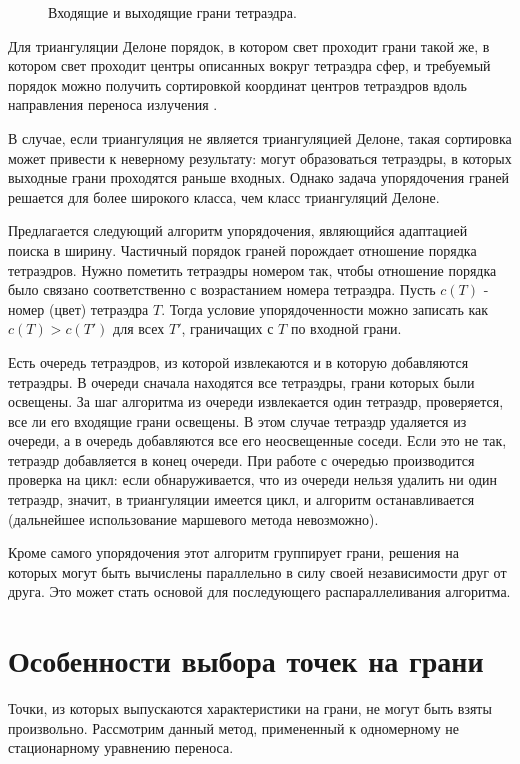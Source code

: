 \begin{figure}[ht!]
\caption{Входящие и выходящие грани тетраэдра.}
\label{fig:4}
\end{figure}

Для триангуляции Делоне порядок, в котором свет проходит грани такой же, в котором свет проходит центры описанных вокруг тетраэдра сфер, и требуемый порядок можно получить сортировкой координат центров тетраэдров вдоль направления переноса излучения \cite{skalko_2014}.

В случае, если триангуляция не является триангуляцией Делоне, такая сортировка может привести к неверному результату: могут образоваться тетраэдры, в которых выходные грани проходятся раньше входных. Однако задача упорядочения граней решается для более широкого класса, чем класс триангуляций Делоне. 

Предлагается следующий алгоритм упорядочения, являющийся адаптацией поиска в ширину. Частичный порядок граней порождает отношение порядка тетраэдров. Нужно пометить тетраэдры номером так, чтобы отношение порядка было связано соответственно с возрастанием номера тетраэдра. Пусть $c(T)$ - номер (цвет) тетраэдра $T$. Тогда условие упорядоченности можно записать как $ c(T) > c (T')$ для всех $T'$, граничащих с $T$ по входной грани. 

Есть очередь тетраэдров, из которой извлекаются и в которую добавляются тетраэдры. В очереди сначала находятся все тетраэдры, грани которых были освещены. За шаг алгоритма из очереди извлекается один тетраэдр, проверяется, все ли его входящие грани освещены. В этом случае тетраэдр удаляется из очереди, а в очередь добавляются все его неосвещенные соседи. Если это не так, тетраэдр добавляется в конец очереди. При работе с очередью производится проверка на цикл: если обнаруживается, что из очереди нельзя удалить ни один тетраэдр, значит, в триангуляции имеется цикл, и алгоритм останавливается (дальнейшее использование маршевого метода невозможно).

Кроме самого упорядочения этот алгоритм группирует грани, решения на которых могут быть вычислены параллельно в силу своей независимости друг от друга. Это может стать основой для последующего распараллеливания алгоритма.
\section{Особенности выбора точек на грани}
Точки, из которых выпускаются характеристики на грани, не могут быть взяты произвольно. Рассмотрим данный метод, примененный к одномерному не стационарному уравнению переноса.

